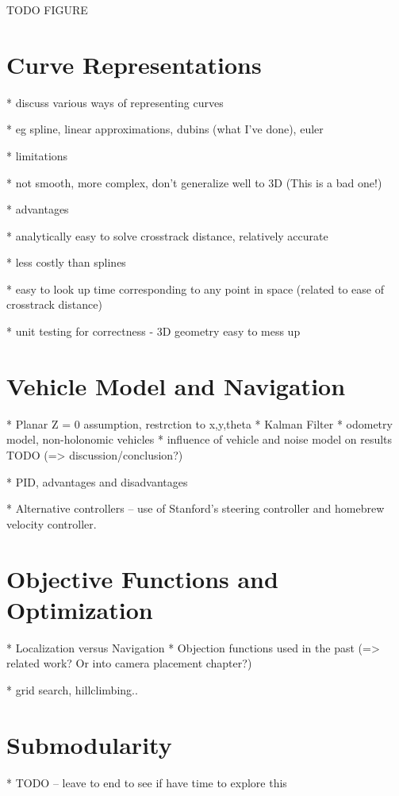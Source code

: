 \documentclass[a4paper,12pt,twoside,openright]{report}
\begin{document}
TODO FIGURE


\section{Curve Representations}

* discuss various ways of representing curves

* eg spline, linear approximations, dubins (what I've done), euler

* limitations

  * not smooth, more complex, don't generalize well to 3D (This is a bad one!)

* advantages

  * analytically easy to solve crosstrack distance, relatively accurate

  * less costly than splines

  * easy to look up time corresponding to any point in space (related to ease of crosstrack distance)

* unit testing for correctness - 3D geometry easy to mess up

\section{Vehicle Model and Navigation}

* Planar Z = 0 assumption, restrction to x,y,theta
* Kalman Filter
* odometry model, non-holonomic vehicles
* influence of vehicle and noise model on results TODO (=> discussion/conclusion?)

* PID, advantages and disadvantages

* Alternative controllers -- use of Stanford's steering controller and homebrew velocity controller.

\section{Objective Functions and Optimization}

* Localization versus Navigation
* Objection functions used in the past (=> related work? Or into camera placement chapter?) 

* grid search, hillclimbing..

\section{Submodularity}
* TODO -- leave to end to see if have time to explore this
\end{document}
